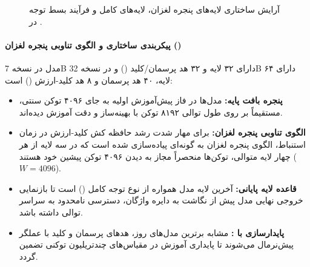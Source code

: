 \begin{figure}[htbp]
\caption{آرایش ساختاری لایه‌های پنجره لغزان، لایه‌های کامل و فرآیند بسط توجه در .}
\label{fig:olmo_3_attention_arch}
\end{figure}

\paragraph*{پیکربندی ساختاری و الگوی تناوبی پنجره لغزان ()}
مدل  در نسخه 7B دارای ۳۲ لایه و ۳۲ هد پرسمان/کلید () و در نسخه 32B دارای ۶۴ لایه، ۴۰ هد پرسمان و ۸ هد کلید-ارزش () است:
\begin{itemize}
    \item \textbf{پنجره بافت پایه:} مدل‌ها در فاز پیش‌آموزش اولیه به جای ۴۰۹۶ توکن سنتی، مستقیماً بر روی طول توالی ۸۱۹۲ توکن با بهینه‌ساز  و دقت  آموزش دیده‌اند.
    \item \textbf{الگوی تناوبی پنجره لغزان:} برای مهار شدت رشد حافظه کش کلید-ارزش در زمان استنباط، الگوی پنجره لغزان به گونه‌ای پیاده‌سازی شده است که در سه لایه از هر چهار لایه متوالی، توکن‌ها منحصراً مجاز به دیدن ۴۰۹۶ توکن پیشین خود هستند ($W=4096$).
    \item \textbf{قاعده لایه پایانی:} آخرین لایه مدل همواره از نوع توجه کامل () است تا بازنمایی خروجی نهایی مدل پیش از نگاشت به دایره واژگان، دسترسی نامحدود به سراسر توالی داشته باشد.
    \item \textbf{پایدارسازی با :} مشابه برترین مدل‌های روز، هدهای پرسمان و کلید با عملگر  پیش‌نرمال می‌شوند تا پایداری آموزش در مقیاس‌های چندتریلیون توکنی تضمین گردد.
\end{itemize}

